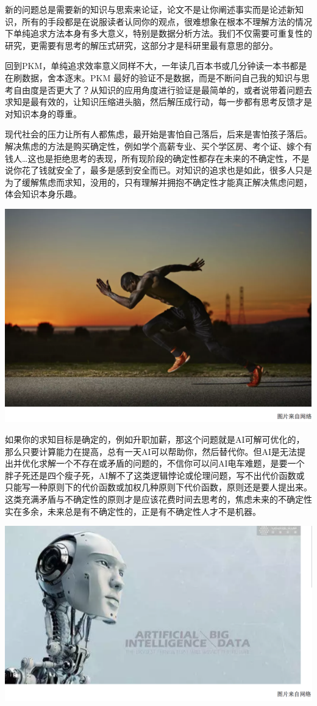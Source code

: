 \documentclass[]{book}
\begin{document}
新的问题总是需要新的知识与思索来论证，论文不是让你阐述事实而是论述新知识，所有的手段都是在说服读者认同你的观点，很难想象在根本不理解方法的情况下单纯追求方法本身有多大意义，特别是数据分析方法。我们不仅需要可重复性的研究，更需要有思考的解压式研究，这部分才是科研里最有意思的部分。

回到PKM，单纯追求效率意义同样不大，一年读几百本书或几分钟读一本书都是在刷数据，舍本逐末。PKM
最好的验证不是数据，而是不断问自己我的知识与思考自由度是否更大了？从知识的应用角度进行验证是最简单的，或者说带着问题去求知是最有效的，让知识压缩进头脑，然后解压成行动，每一步都有思考反馈才是对知识本身的尊重。

现代社会的压力让所有人都焦虑，最开始是害怕自己落后，后来是害怕孩子落后。解决焦虑的方法是购买确定性，例如学个高薪专业、买个学区房、考个证、嫁个有钱人\ldots{}这也是拒绝思考的表现，所有现阶段的确定性都存在未来的不确定性，不是说你花了钱就安全了，最多是感到安全而已。对知识的追求也是如此，很多人只是为了缓解焦虑而求知，没用的，只有理解并拥抱不确定性才能真正解决焦虑问题，体会知识本身乐趣。

\includegraphics[width=8.33in]{images/gtd4}

如果你的求知目标是确定的，例如升职加薪，那这个问题就是AI可解可优化的，那么只要计算能力在提高，总有一天AI可以帮助你，然后替代你。但AI是无法提出并优化求解一个不存在或矛盾的问题的，不信你可以问AI电车难题，是要一个胖子死还是四个瘦子死，AI解不了这类逻辑悖论或伦理问题，写不出代价函数或只能写一种原则下的代价函数或加权几种原则下代价函数，原则还是要人提出来。这类充满矛盾与不确定性的原则才是应该花费时间去思考的，焦虑未来的不确定性实在多余，未来总是有不确定性的，正是有不确定性人才不是机器。

\includegraphics[width=8.33in]{images/gtd5}
\end{document}
